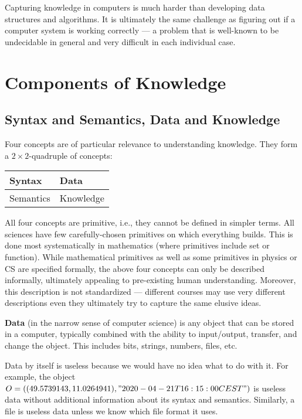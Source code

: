 Capturing knowledge in computers is much harder than developing data structures and algorithms.
It is ultimately the same challenge as figuring out if a computer system is working correctly --- a problem that is well-known to be undecidable in general and very difficult in each individual case.

\section{Components of Knowledge}

\subsection{Syntax and Semantics, Data and Knowledge}

Four concepts are of particular relevance to understanding knowledge.
They form a $2\times 2$-quadruple of concepts:

\begin{center}
\begin{tabular}{l|l}
Syntax & Data \\
\hline
Semantics & Knowledge
\end{tabular}
\end{center}

All four concepts are primitive, i.e., they cannot be defined in simpler terms.
All sciences have few carefully-chosen primitives on which everything builds.
This is done most systematically in mathematics (where primitives include set or function).
While mathematical primitives as well as some primitives in physics or CS are specified formally, the above four concepts can only be described informally, ultimately appealing to pre-existing human understanding.
Moreover, this description is not standardized --- different courses may use very different descriptions even they ultimately try to capture the same elusive ideas.

\textbf{Data} (in the narrow sense of computer science) is any object that can be stored in a computer, typically combined with the ability to input/output, transfer, and change the object.
This includes bits, strings, numbers, files, etc.

Data by itself is useless because we would have no idea what to do with it.
For example, the object $O=((49.5739143, 11.0264941), "2020-04-21T16:15:00CEST")$ is useless data without additional information about its syntax and semantics.
Similarly, a file is useless data unless we know which file format it uses.

